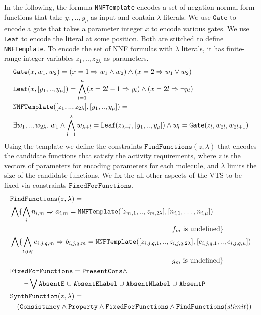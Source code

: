 In the following, the formula \texttt{NNFTemplate} encodes a set of
negation normal form functions that take $y_1,..,y_\mu$ as input and
contain $\lambda$ literals.
%
We use $\texttt{Gate}$ to encode a gate that takes a parameter integer
$x$ to encode various gates.
%
We use $\texttt{Leaf} $ to encode the literal at some position.
%
Both are stitched to define \texttt{NNFTemplate}.
%
To encode the set of NNF formulas with $\lambda$ literals, it has
finite-range integer variables
$z_1,..,z_{2\lambda}$ as parameters.
%
\begin{align*}
&\texttt{Gate}( x, w_1, w_2 ) = ( x  = 1 \Rightarrow w_1  \land w_2 ) \land  
( x = 2  \Rightarrow w_1  \lor w_2 ) \\
&\texttt{Leaf}( x, [y_1,..,y_\mu] ) =
\bigwedge\limits_{l=1}^{\mu} ( x = 2l-1  \Rightarrow y_{l}) \land ( x = 2l  \Rightarrow \lnot y_{l})\\
&\texttt{NNFTemplate}([z_1,..,z_{2\lambda}],[y_1,..,y_\mu] ) = \\
&\exists w_1,..,w_{2\lambda}.\;w_1 \land \bigwedge_{l=1}^{\lambda} w_{\lambda+l} = \texttt{Leaf}( z_{\lambda+l}, [y_1,..,y_\mu] ) \land
w_{l} = \texttt{Gate}( z_l, w_{2l},w_{2l+1})
\end{align*}
%
Using the template we define the constraints $\texttt{FindFunctions}(z,\lambda)$
that encodes the candidate functions that satisfy the activity requirements,
where $z$ is the vectors of parameters for encoding parameters
for each molecule,
and $\lambda$ limits the size of the candidate functions. 
%
We fix the all other aspects of the VTS to be fixed via constraints
$\texttt{FixedForFunctions}$.
%
\begin{align*}
&\texttt{FindFunctions}(z,\lambda) =\\
&\Land \{ \bigwedge\limits_{i} n_{i,m} \limplies a_{i,m} = 
\texttt{NNFTemplate}([z_{m,1},..,z_{m,2\lambda}],[n_{i,1},\dots,n_{i,\mu}] ) \\
& \hspace{8cm}|
\nodef_m \text{ is undefined}\} \\
&\Land \{ \bigwedge\limits_{i,j,q} e_{i,j,q,m} \limplies b_{i,j,q,m} = 
\texttt{NNFTemplate}([z_{i,j,q,1},..,z_{i,j,q,2\lambda}],[e_{i,j,q,1},..,e_{i,j,q,\mu}] ) \\
& \hspace{8cm} | \edgef_m \text{ is undefined}
\}\\
& \texttt{FixedForFunctions} = \texttt{PresentCons} \land\\
& \quad \quad
\lnot \Lor \texttt{AbsentE} \;\union\; \texttt{AbsentELabel} \;\union\;
\texttt{AbsentNLabel} \;\union\;
\texttt{AbsentP}\\
&\texttt{SynthFunction}(z,\lambda) = \\
& \quad
(  \texttt{Consistancy}\land \texttt{Property} \land
\texttt{FixedForFunctions} \land \texttt{FindFunctions}(slimit) )
\end{align*}
